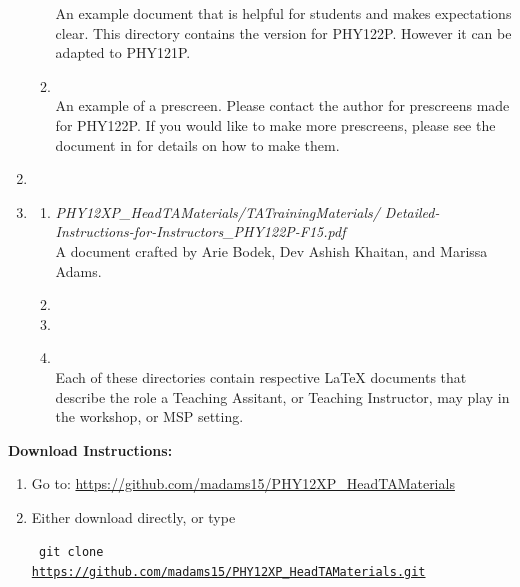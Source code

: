 \documentclass[12pt]{article}
\begin{document}
\begin{mdframed}[style=MyFrame]
\begin{enumerate}
\begin{enumerate}
			An example document that is helpful for students and makes expectations clear. This directory contains the version for PHY122P. However it can be adapted to PHY121P.
		 \item {} \\
			An example of a prescreen. Please contact the author for prescreens made for PHY122P. If you would like to make more prescreens, please see the document in  for details on how to make them.
	\end{enumerate}
	\item {}
	\item {}
	\begin{enumerate}
		\item \emph{PHY12XP\_HeadTAMaterials/TATrainingMaterials/ \newline Detailed-Instructions-for-Instructors\_PHY122P-F15.pdf} \\
			A document crafted by Arie Bodek, Dev Ashish Khaitan, and Marissa Adams. 
		\item {}
		\item {}
		\item {} \\
			Each of these directories contain respective LaTeX documents that describe the role a Teaching Assitant, or Teaching Instructor, may play in the workshop, or MSP setting.
	\end{enumerate}
\end{enumerate}

\Large
\noindent \textbf{Download Instructions:}

\small
\begin{enumerate} 
	\item Go to: \url{https://github.com/madams15/PHY12XP_HeadTAMaterials}
	\item Either download directly, or type\\

	\begin{mdframed}[style=CommandFrame]
	
		\footnotesize
		\texttt{ git clone \\ \url{https://github.com/madams15/PHY12XP\_HeadTAMaterials.git}}
		\small
		

\end{mdframed}
\end{enumerate}
\end{mdframed}
\end{document}
